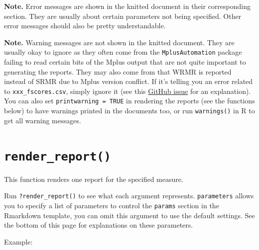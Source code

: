 \documentclass[
]{book}
\begin{document}
\textbf{Note.} Error messages are shown in the knitted document in their corresponding section. They are usually about certain parameters not being specified. Other error messages should also be pretty understandable.

\textbf{Note.} Warning messages are not shown in the knitted document. They are usually okay to ignore as they often come from the \texttt{MplusAutomation} package failing to read certain bits of the Mplus output that are not quite important to generating the reports. They may also come from that WRMR is reported instead of SRMR due to Mplus version conflict. If it's telling you an error related to \texttt{xxx\_fscores.csv}, simply ignore it (see this \href{https://github.com/nyuglobalties/mrautomatr/issues/20}{GitHub issue} for an explanation). You can also set \texttt{printwarning\ =\ TRUE} in rendering the reports (see the functions below) to have warnings printed in the documents too, or run \texttt{warnings()} in R to get all warning messages.

\hypertarget{render_report}{%
\section{\texorpdfstring{\texttt{render\_report()}}{render\_report()}}\label{render_report}}

This function renders one report for the specified measure.

Run \texttt{?render\_report()} to see what each argument represents. \texttt{parameters} allows you to specify a list of parameters to control the \texttt{params} section in the Rmarkdown template, you can omit this argument to use the default settings. See the bottom of this page for explanations on these parameters.

Example:
\end{document}
